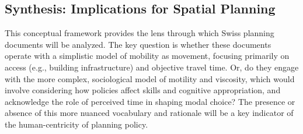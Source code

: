 \subsection{Synthesis: Implications for Spatial Planning}

This conceptual framework provides the lens through which Swiss planning documents will be analyzed. The key question is whether these documents operate with a simplistic model of mobility as movement, focusing primarily on access (e.g., building infrastructure) and objective travel time. Or, do they engage with the more complex, sociological model of motility and viscosity, which would involve considering how policies affect skills and cognitive appropriation, and acknowledge the role of perceived time in shaping modal choice? The presence or absence of this more nuanced vocabulary and rationale will be a key indicator of the human-centricity of planning policy.